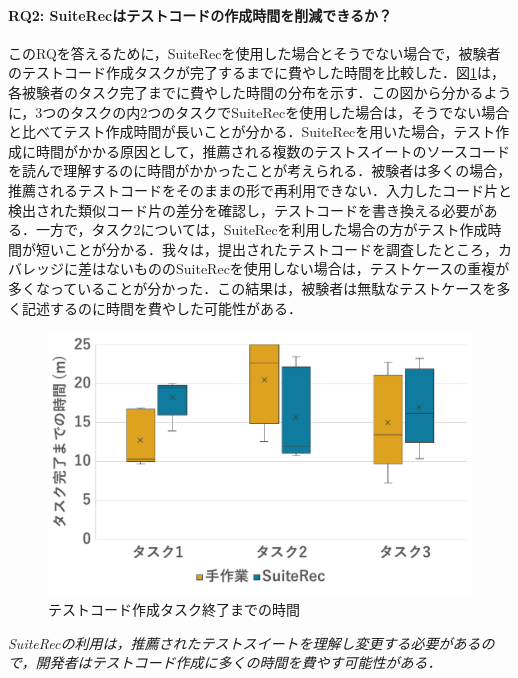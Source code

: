 \documentclass[12pt]{jarticle} %
\begin{document}
\paragraph{RQ2: {\sf SuiteRec}はテストコードの作成時間を削減できるか？}このRQを答えるために，{\sf SuiteRec}を使用した場合とそうでない場合で，被験者のテストコード作成タスクが完了するまでに費やした時間を比較した．図\ref{time}は，各被験者のタスク完了までに費やした時間の分布を示す．この図から分かるように，3つのタスクの内2つのタスクで{\sf SuiteRec}を使用した場合は，そうでない場合と比べてテスト作成時間が長いことが分かる．{\sf SuiteRec}を用いた場合，テスト作成に時間がかかる原因として，推薦される複数のテストスイートのソースコードを読んで理解するのに時間がかかったことが考えられる．被験者は多くの場合，推薦されるテストコードをそのままの形で再利用できない．入力したコード片と検出された類似コード片の差分を確認し，テストコードを書き換える必要がある．一方で，タスク2については，{\sf SuiteRec}を利用した場合の方がテスト作成時間が短いことが分かる．我々は，提出されたテストコードを調査したところ，カバレッジに差はないものの{\sf SuiteRec}を使用しない場合は，テストケースの重複が多くなっていることが分かった．この結果は，被験者は無駄なテストケースを多く記述するのに時間を費やした可能性がある．


\begin{figure}[htbp]
\begin{center}
\includegraphics[width=12cm]{pic/time.pdf}
\caption{テストコード作成タスク終了までの時間}
\label{time}
\end{center}
\end{figure}

\begin{breakbox}
\textit{{\sf SuiteRec}の利用は，推薦されたテストスイートを理解し変更する必要があるので，開発者はテストコード作成に多くの時間を費やす可能性がある．}
\end{breakbox}
\end{document}
